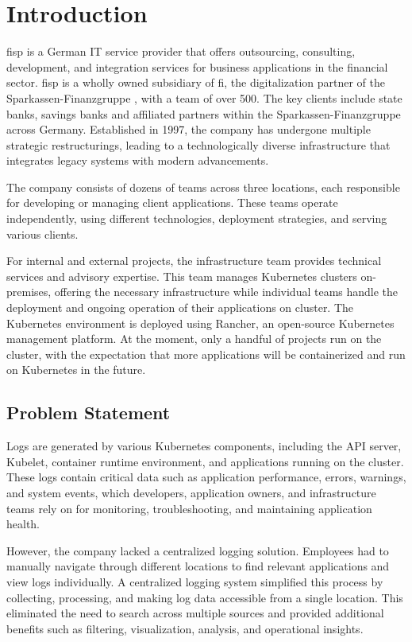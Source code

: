 \documentclass[../main.tex]{subfiles}
\begin{document}
\chapter{Introduction}

\gls{fisp} \cite{fisp} is a German IT service provider that offers outsourcing, consulting, development, and integration services for business applications in the financial sector. \gls{fisp} is a wholly owned subsidiary of \gls{fi}, the digitalization partner of the Sparkassen-Finanzgruppe \cite{spfi}, with a team of over 500.  The key clients include state banks, savings banks and affiliated partners within the Sparkassen-Finanzgruppe across Germany. Established in 1997, the company has undergone multiple strategic restructurings, leading to a technologically diverse infrastructure that integrates legacy systems with modern advancements.

The company consists of dozens of teams across three locations, each responsible for developing or managing client applications. These teams operate independently, using different technologies, deployment strategies, and serving various clients.

For internal and external projects, the infrastructure team provides technical services and advisory expertise. This team manages Kubernetes clusters on-premises, offering the necessary infrastructure while individual teams handle the deployment and ongoing operation of their applications on cluster. The Kubernetes environment is deployed using Rancher, an open-source Kubernetes management platform. At the moment, only a handful of projects run on the cluster, with the expectation that more applications will be containerized and run on Kubernetes in the future.

\section{Problem Statement}

Logs are generated by various Kubernetes components, including the API server, Kubelet, container runtime environment, and applications running on the cluster. These logs contain critical data such as application performance, errors, warnings, and system events, which developers, application owners, and infrastructure teams rely on for monitoring, troubleshooting, and maintaining application health.

However, the company lacked a centralized logging solution. Employees had to manually navigate through different locations to find relevant applications and view logs individually. A centralized logging system simplified this process by collecting, processing, and making log data accessible from a single location. This eliminated the need to search across multiple sources and provided additional benefits such as filtering, visualization, analysis, and operational insights.
\end{document}
